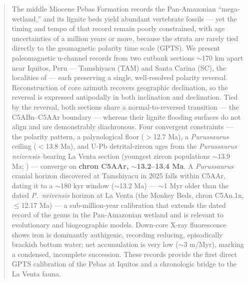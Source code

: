 \documentclass[12pt]{article}
\begin{document}
\begin{abstract}
\noindent The middle Miocene Pebas Formation records the Pan-Amazonian ``mega-wetland,''
and its lignite beds yield abundant vertebrate fossils --- yet the timing and tempo of that
record remain poorly constrained, with age uncertainties of a million years or more, because
the strata are rarely tied directly to the geomagnetic polarity time scale (GPTS). We
present paleomagnetic u-channel records from two cutbank sections $\sim$170 km apart near
Iquitos, Peru --- Tamshiyacu (TAM) and Santa Carina (SC), the localities of
\citet{Gingras2002} --- each preserving a single, well-resolved polarity reversal.
Reconstruction of core azimuth recovers geographic declination, so the reversal is expressed
antipodally in both inclination and declination. Tied by the reversal, both sections share a
normal-to-reversed transition --- the C5ABn--C5AAr boundary --- whereas their lignite
flooding surfaces do not align and are demonstrably diachronous. Four convergent constraints
--- the polarity pattern, a palynological floor ($>$12.7 Ma), a \textit{Purussaurus} ceiling
($<$13.8 Ma), and U-Pb detrital-zircon ages from the \textit{Purussaurus neivensis}--bearing
La Venta section (youngest zircon populations $\sim$13.9 Ma; \citealp{MoraRojas2023}) ---
converge on \textbf{chron C5AAr, $\sim$13.2--13.4 Ma}. A \textit{Purussaurus} cranial horizon
discovered at Tamshiyacu in 2025 falls within C5AAr, dating it to a $\sim$180 kyr window
($\sim$13.2 Ma) --- $\sim$1 Myr older than the dated \textit{P.\ neivensis} horizon at La Venta
(the Monkey Beds, chron C5An.1n, $\le$12.17 Ma) --- a sub-million-year calibration that extends
the dated record of the genus in the Pan-Amazonian wetland and is relevant to evolutionary and
biogeographic models. Down-core X-ray fluorescence shows iron is dominantly
authigenic, recording reducing, episodically brackish bottom water; net accumulation is very
low ($\sim$3 m/Myr), marking a condensed, incomplete succession.
These records provide the first direct GPTS calibration of the Pebas at Iquitos and a
chronologic bridge to the La Venta fauna.
\end{abstract}
\end{document}
